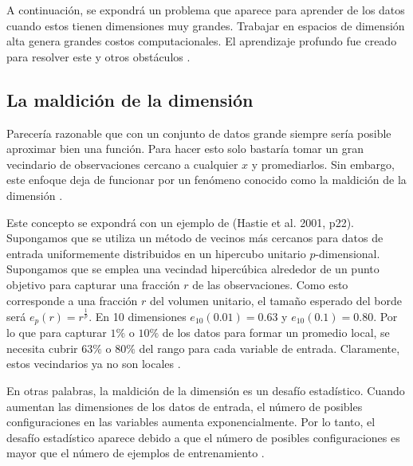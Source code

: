 \vspace{1em}

A continuación, se expondrá un problema que aparece para aprender de los datos cuando estos tienen dimensiones muy grandes. Trabajar en espacios de dimensión alta genera grandes costos computacionales. El aprendizaje profundo fue creado para resolver este y otros obstáculos \cite{goodfellow-et-al-2016}.

\subsection{La maldición de la dimensión}
Parecería razonable que con un conjunto de datos grande siempre sería posible aproximar bien una función. Para hacer esto solo bastaría tomar un gran vecindario de observaciones cercano a cualquier $x$ y promediarlos. Sin embargo, este enfoque deja de funcionar por un fenómeno conocido como la maldición de la dimensión \cite{Bishop:2006:PRM:1162264} \cite{hastie01statisticallearning} \cite{Murphy:2012:MLP:2380985}.

\vspace{1em}

Este concepto se expondrá con un ejemplo de (Hastie et al. 2001, p22). Supongamos que se utiliza un método de vecinos más cercanos para datos de entrada uniformemente distribuidos en un hipercubo unitario $p$-dimensional. Supongamos que se emplea una vecindad hipercúbica alrededor de un punto objetivo para capturar una fracción $r$ de las observaciones. Como esto corresponde a una fracción $r$ del volumen unitario, el tamaño esperado del borde será $e_p(r) = r^{\frac{1}{p}}$. En 10 dimensiones $e_10(0.01)=0.63$ y $e_10(0.1) = 0.80$. Por lo que para capturar $1\%$ o $10\%$ de los datos para formar un promedio local, se necesita cubrir $63\%$ o $80\%$ del rango para cada variable de entrada. Claramente, estos vecindarios ya no son locales \cite{hastie01statisticallearning}.

\vspace{1em}

En otras palabras, la maldición de la dimensión es un desafío estadístico. Cuando aumentan las dimensiones de los datos de entrada, el número de posibles configuraciones en las variables aumenta exponencialmente. Por lo tanto, el desafío estadístico aparece debido a que el número de posibles configuraciones es mayor que el número de ejemplos de entrenamiento \cite{goodfellow-et-al-2016}.

